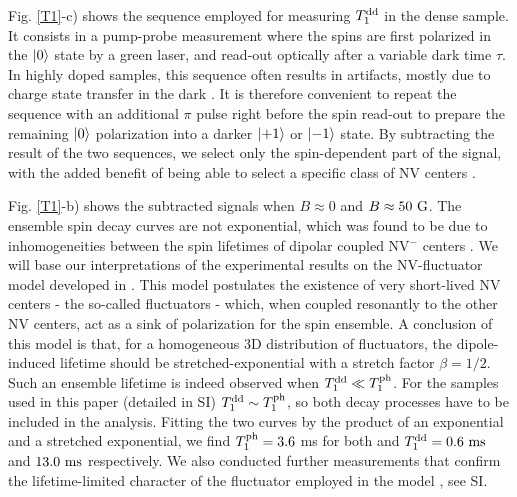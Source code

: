 \documentclass[preprintnumbers,amsmath,amssymb,superscriptaddress,twocolumn,showpacs]{revtex4-2}
\begin{document}
Fig. \ref{T1}-c) shows the sequence employed for measuring $T_1^{\rm dd}$ in the dense sample. 
It consists in a pump-probe measurement where the spins are first polarized in the $\ket{0}$ state by a green laser, and read-out optically after a variable dark time $\tau$. In highly doped samples, this sequence often results in artifacts, mostly due to charge state transfer in the dark \citep{giri_coupled_2018, giri_selective_2019}. It is therefore convenient to repeat the sequence with an additional $\pi$ pulse right before the spin read-out to prepare the remaining $\ket{0}$ polarization into a darker $\ket{+1}$ or $\ket{-1}$ state. By subtracting the result of the two sequences, we select only the spin-dependent part of the signal, with the added benefit of being able to select a specific class of NV centers \citep{jarmola_temperature-_2012, mrozek_longitudinal_2015, choi2017depolarization}. 

Fig. \ref{T1}-b) shows the subtracted signals when $B\approx 0$ and $B \approx 50\ \rm G$.
The ensemble spin decay curves are not exponential, which was found to be due to inhomogeneities between the spin lifetimes of dipolar coupled NV$^-$ centers \citep{choi2017depolarization}.
We will base our interpretations of the experimental results on the NV-fluctuator model developed in \citep{choi2017depolarization}. This model postulates the existence of very short-lived NV centers - the so-called fluctuators - which, when coupled resonantly to the other NV centers, act as a sink of polarization for the spin ensemble. A conclusion of this model is that, for a homogeneous 3D distribution of fluctuators, the dipole-induced lifetime should be stretched-exponential with a stretch factor $\beta=1/2$. Such an ensemble lifetime is indeed observed when $T_1^{\rm dd} \ll T_1^{\rm ph}$.
For the samples used in this paper (detailed in SI) $T_1^{\rm dd} \sim T_1^{\rm ph}$, so both decay processes have to be included in the analysis. Fitting the two curves by the product of an exponential and a stretched exponential, we find $T_1^{\rm ph}=3.6$ ms for both and $T_1^{\rm dd}= 0.6\ \rm ms$ and $13.0\ \rm ms$ respectively. We also conducted further measurements that confirm the lifetime-limited character of the fluctuator employed in the model \citep{choi2017depolarization}, see SI. 
\end{document}
